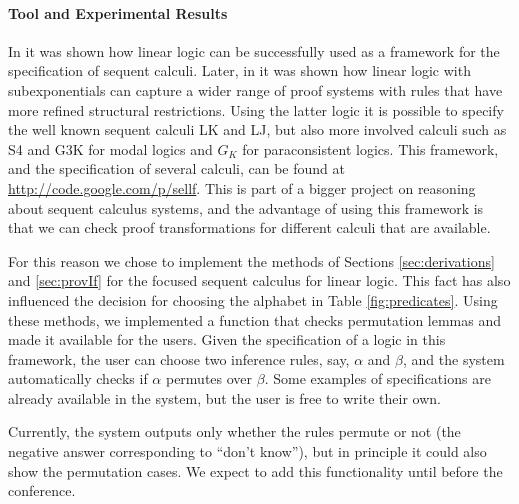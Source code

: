 \documentclass{new_tlp}
\begin{document}
\paragraph{Tool and Experimental Results}

In \cite{miller.ep} it was shown how linear logic can be successfully used as
a framework for the specification of sequent calculi. Later, in \cite{nigam11lsfa}
it was shown how linear logic with subexponentials can capture a wider range of
proof systems with rules that have more refined structural restrictions. Using
the latter logic it is possible to specify the well known sequent calculi LK and LJ,
but also more involved calculi such as S4 and G3K \cite{negri05} for modal
logics and $G_K$ \cite{avron13} for
paraconsistent logics. This framework, and the specification of several calculi, can be
found at \url{http://code.google.com/p/sellf}. This is part of a bigger project
on reasoning about sequent calculus systems, and the advantage of using this
framework is that we can check proof transformations for different calculi that
are available.

For this reason we chose to implement the methods of Sections
\ref{sec:derivations} and \ref{sec:provIf} for the focused sequent calculus for
linear logic. This fact has also influenced the decision for choosing the
alphabet in Table \ref{fig:predicates}. Using these methods, we implemented a
function that checks permutation lemmas and made it available for the users.
Given the specification of a logic in this framework, the user can choose two
inference rules, say, $\alpha$ and $\beta$, and the system automatically checks
if $\alpha$ permutes over $\beta$. Some examples of specifications are already
available in the system, but the user is free to write their own.

Currently, the system outputs only
whether the rules permute  or not (the negative answer corresponding to ``don't
know''), but in principle it could also show
the permutation cases. We expect to add this functionality until before the conference.
\end{document}
